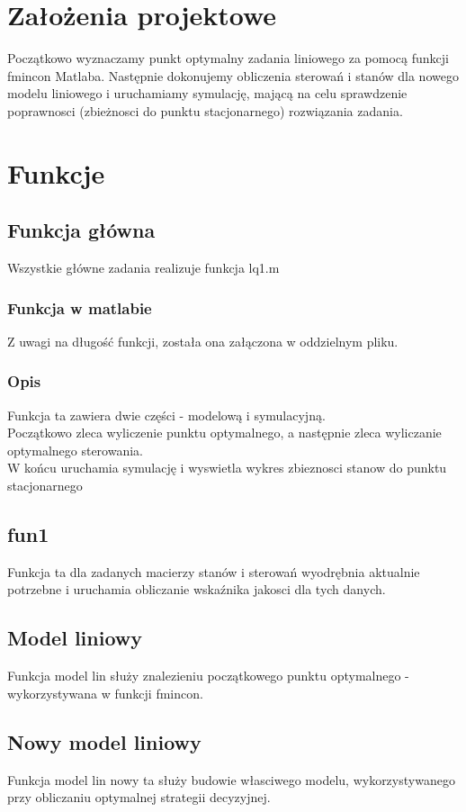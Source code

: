 \documentclass[11pt,a4paper]{article}
\begin{document}
\section{Założenia projektowe}
Początkowo wyznaczamy punkt optymalny zadania liniowego za pomocą funkcji fmincon Matlaba. Następnie dokonujemy obliczenia sterowań i stanów dla nowego modelu liniowego i uruchamiamy symulację, mającą na celu sprawdzenie poprawnosci (zbieżnosci do punktu stacjonarnego) rozwiązania zadania.

\section{Funkcje}
\subsection{Funkcja główna}
Wszystkie główne zadania realizuje funkcja lq1.m
\subsubsection{Funkcja w matlabie}
Z uwagi na długość funkcji, została ona załączona w oddzielnym pliku.

\subsubsection{Opis}
Funkcja ta zawiera dwie części - modelową i symulacyjną.\\
Początkowo zleca wyliczenie punktu optymalnego, a następnie zleca wyliczanie optymalnego sterowania.\\
W końcu uruchamia symulację i wyswietla wykres zbieznosci stanow do punktu stacjonarnego

\subsection{fun1}
Funkcja ta dla zadanych macierzy stanów i sterowań wyodrębnia aktualnie potrzebne i uruchamia obliczanie wskaźnika jakosci dla tych danych.

\subsection{Model liniowy}
Funkcja model lin służy znalezieniu początkowego punktu optymalnego - wykorzystywana w funkcji fmincon.

\subsection{Nowy model liniowy}
Funkcja model lin nowy ta służy budowie własciwego modelu, wykorzystywanego przy obliczaniu optymalnej strategii decyzyjnej.
\end{document}
